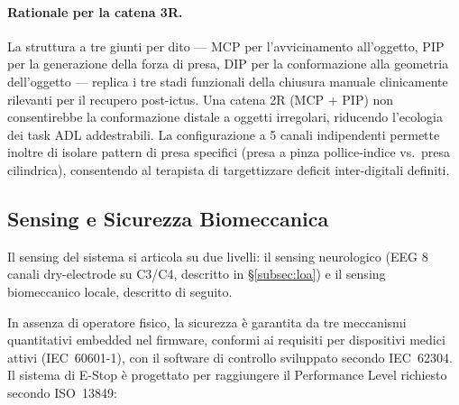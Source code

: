 \documentclass[a4paper,11pt]{article}
\begin{document}
\paragraph{Rationale per la catena 3R.}
La struttura a tre giunti per dito — MCP per l'avvicinamento all'oggetto, PIP
per la generazione della forza di presa, DIP per la conformazione alla geometria
dell'oggetto — replica i tre stadi funzionali della chiusura manuale clinicamente
rilevanti per il recupero post-ictus. Una catena 2R (MCP + PIP) non consentirebbe
la conformazione distale a oggetti irregolari, riducendo l'ecologia dei task ADL
addestrabili. La configurazione a 5 canali indipendenti permette inoltre di isolare
pattern di presa specifici (presa a pinza pollice-indice vs.\ presa cilindrica),
consentendo al terapista di targettizzare deficit inter-digitali definiti.

\subsection{Sensing e Sicurezza Biomeccanica}

Il sensing del sistema si articola su due livelli: il sensing neurologico (EEG
8 canali dry-electrode su C3/C4, descritto in \S\ref{subsec:loa}) e il sensing
biomeccanico locale, descritto di seguito.

In assenza di operatore fisico, la sicurezza è garantita da tre meccanismi
quantitativi embedded nel firmware, conformi ai requisiti per dispositivi medici
attivi (IEC~60601-1), con il software di controllo sviluppato secondo IEC~62304.
Il sistema di E-Stop è progettato per raggiungere il Performance Level richiesto
secondo ISO~13849:
\end{document}
